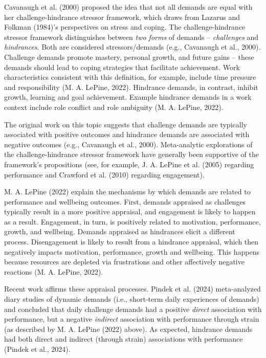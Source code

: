 \documentclass[
  man,mask]{apa7}
\begin{document}
Cavanaugh et al. (2000) proposed the idea that not all demands are equal with her challenge-hindrance stressor framework, which draws from Lazarus and Folkman (1984)'s perspectives on stress and coping. The challenge-hindrance stressor framework distinguishes between \emph{two forms} of demands -- \emph{challenges} and \emph{hindrances}. Both are considered stressors/demands (e.g., Cavanaugh et al., 2000). Challenge demands promote mastery, personal growth, and future gains -- these demands should lead to coping strategies that facilitate achievement. Work characteristics consistent with this definition, for example, include time pressure and responsibility (M. A. LePine, 2022). Hindrance demands, in contrast, inhibit growth, learning and goal achievement. Example hindrance demands in a work context include role conflict and role ambiguity (M. A. LePine, 2022).

The original work on this topic suggests that challenge demands are typically associated with positive outcomes and hindrance demands are associated with negative outcomes (e.g., Cavanaugh et al., 2000). Meta-analytic explorations of the challenge-hindrance stressor framework have generally been supportive of the framework's propositions (see, for example, J. A. LePine et al. (2005) regarding performance and Crawford et al. (2010) regarding engagement).

M. A. LePine (2022) explain the mechanisms by which demands are related to performance and wellbeing outcomes. First, demands appraised as challenges typically result in a more positive appraisal, and engagement is likely to happen as a result. Engagement, in turn, is positively related to motivation, performance, growth, and wellbeing. Demands appraised as hindrances elicit a different process. Disengagement is likely to result from a hindrance appraisal, which then negatively impacts motivation, performance, growth and wellbeing. This happens because resources are depleted via frustrations and other affectively negative reactions (M. A. LePine, 2022).

Recent work affirms these appraisal processes. Pindek et al. (2024) meta-analyzed diary studies of dynamic demands (i.e., short-term daily experiences of demands) and concluded that daily challenge demands had a positive \emph{direct} association with performance, but a negative \emph{indirect} association with performance through strain (as described by M. A. LePine (2022) above). As expected, hindrance demands had both direct and indirect (through strain) associations with performance (Pindek et al., 2024).
\end{document}
